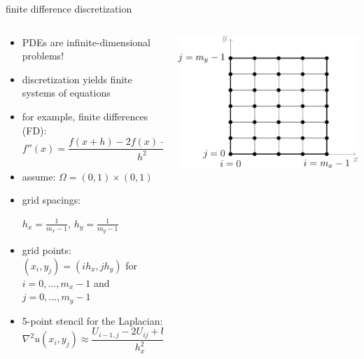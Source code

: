 \documentclass[10pt,
               svgnames,
               hyperref={colorlinks,citecolor=DeepPink4,linkcolor=FireBrick,urlcolor=Maroon},
               usepdftitle=false]{beamer}
\newcommand{\grad}{\nabla}
\begin{document}
\begin{frame}{finite difference discretization}
\begin{columns}
\begin{column}{0.7\textwidth}
\begin{itemize}
\item PDEs are infinite-dimensional problems!
\item discretization yields finite systems of equations
\item for example, finite differences (FD):
    $$f''(x) = \frac{f(x+h) - 2 f(x) + f(x-h)}{h^2} + O(h^2)$$
\item assume: $\Omega = (0,1) \times (0,1)$
\item grid spacings: \strut $h_x=\frac{1}{m_x-1}$, $h_y=\frac{1}{m_y-1}$
\item grid points: $(x_i,y_j) = (ih_x,jh_y)$ for $i=0,\dots,m_x-1$ and $j=0,\dots,m_y-1$
\item 5-point stencil for the Laplacian:
{\small
$$\grad^2 u(x_i,y_j) \approx \frac{U_{i-1,j} - 2 U_{ij} + U_{i+1,j}}{h_x^2} + \frac{U_{i,j-1} - 2 U_{ij} + U_{i,j+1}}{h_y^2}$$
}
\end{itemize}
\end{column}
\begin{column}{0.3\textwidth}
\hfill \includegraphics[width=\textwidth]{images/gridindexing.png}


\end{column}
\end{columns}
\end{frame}
\end{document}
